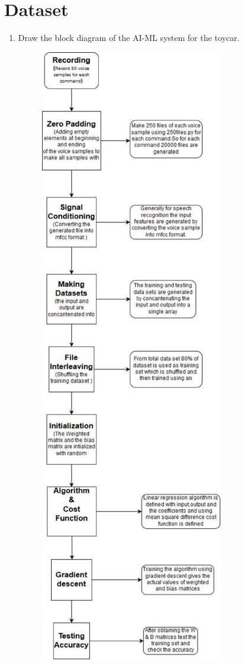 \documentclass[journal,12pt,twocolumn]{IEEEtran}
\renewcommand\thesection{\arabic{section}}
\begin{document}
\section{Dataset}
%
\begin{enumerate}[label=\thesection.\arabic*
,ref=\thesection.\theenumi]

\item Draw the block diagram of the AI-ML system for the toycar.
\begin{figure}[h]
\begin{center}
\includegraphics[scale=0.5]{./figs/block_diag.eps}

\end{center}
\end{figure}
\end{enumerate}
\end{document}

